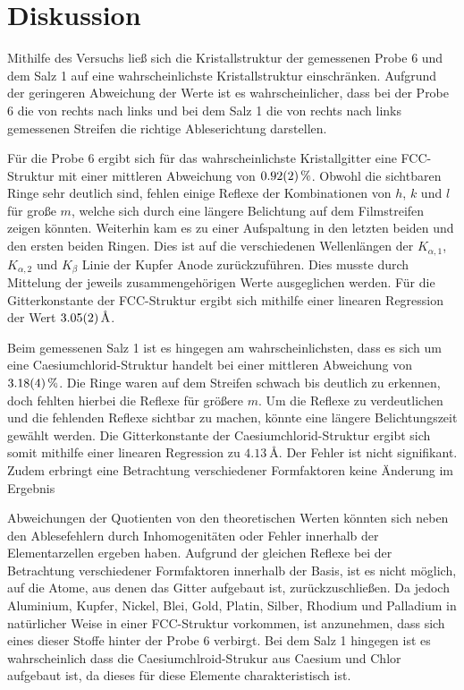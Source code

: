 \clearpage
\section{Diskussion} %
\label{sec:diskussion}

Mithilfe des Versuchs ließ sich die Kristallstruktur der gemessenen Probe 6 und dem Salz 1 auf eine wahrscheinlichste Kristallstruktur einschränken.
Aufgrund der geringeren Abweichung der Werte ist es wahrscheinlicher, dass bei der Probe 6 die von rechts nach links und bei dem Salz 1 die von rechts nach links gemessenen Streifen die richtige Ableserichtung darstellen.

Für die Probe 6 ergibt sich für das wahrscheinlichste Kristallgitter eine FCC-Struktur mit einer mittleren Abweichung von $\SI{0.92 \pm 0.02}{\percent}$.
Obwohl die sichtbaren Ringe sehr deutlich sind, fehlen einige Reflexe der Kombinationen von $h$, $k$ und $l$ für große $m$, welche sich durch eine längere Belichtung auf dem Filmstreifen zeigen könnten.
Weiterhin kam es zu einer Aufspaltung in den letzten beiden und den ersten beiden Ringen.
Dies ist auf die verschiedenen Wellenlängen der $K_{\alpha,1}$, $K_{\alpha,2}$ und $K_{\beta}$ Linie der Kupfer Anode zurückzuführen.
Dies musste durch Mittelung der jeweils zusammengehörigen Werte ausgeglichen werden.
Für die Gitterkonstante der FCC-Struktur ergibt sich mithilfe einer linearen Regression der Wert $\SI{3.05 \pm 0.02}{\angstrom}$.

Beim gemessenen Salz 1 ist es hingegen am wahrscheinlichsten, dass es sich um eine Caesiumchlorid-Struktur handelt bei einer mittleren Abweichung von $\SI{3.18 \pm 0.04}{\percent}$.
Die Ringe waren auf dem Streifen schwach bis deutlich zu erkennen, doch fehlten hierbei die Reflexe für größere $m$.
Um die Reflexe zu verdeutlichen und die fehlenden Reflexe sichtbar zu machen, könnte eine längere Belichtungszeit gewählt werden.
Die Gitterkonstante der Caesiumchlorid-Struktur ergibt sich somit mithilfe einer linearen Regression zu $\SI{4.13}{\angstrom}$.
Der Fehler ist nicht signifikant.
Zudem erbringt eine Betrachtung verschiedener Formfaktoren keine Änderung im Ergebnis

Abweichungen der Quotienten von den theoretischen Werten könnten sich neben den Ablesefehlern durch Inhomogenitäten oder Fehler innerhalb der Elementarzellen ergeben haben.
Aufgrund der gleichen Reflexe bei der Betrachtung verschiedener Formfaktoren innerhalb der Basis, ist es nicht möglich, auf die Atome, aus denen das Gitter aufgebaut ist, zurückzuschließen.
Da jedoch Aluminium, Kupfer, Nickel, Blei, Gold, Platin, Silber, Rhodium und Palladium in natürlicher Weise in einer FCC-Struktur vorkommen, ist anzunehmen, dass sich eines dieser Stoffe hinter der Probe 6 verbirgt.
Bei dem Salz 1 hingegen ist es wahrscheinlich dass die Caesiumchlroid-Strukur aus Caesium und Chlor aufgebaut ist, da dieses für diese Elemente charakteristisch ist.
